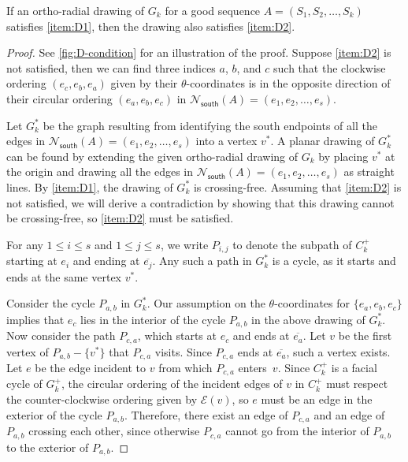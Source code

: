 \documentclass{article}\usepackage[a4paper,margin=20mm]{geometry}
\newcommand{\EE}{\mathcal{E}}
\newcommand{\Nsouth}{\mathcal{N}_\mathsf{south}}
\begin{document}
 \begin{lemma}\label{lem:good-drawing-condition}
If an ortho-radial drawing of $G_k$ for a good sequence $A=(S_1, S_2, \ldots, S_{k})$ satisfies \ref{item:D1}, then the drawing also satisfies \ref{item:D2}.
 \end{lemma}
 \begin{proof}
 See \cref{fig:D-condition} for an illustration of the proof.
 Suppose \ref{item:D2} is not satisfied, then we can find three indices $a$, $b$, and $c$ such that the clockwise ordering $(e_c, e_b, e_a)$  given  by their $\theta$-coordinates is in the opposite direction of their circular ordering $(e_a, e_b, e_c)$ in $\Nsouth(A) = (e_1, e_2, \ldots, e_s)$. 
 
 Let $G_k^\ast$ be the graph resulting from identifying the south endpoints of all the edges in $\Nsouth(A) = (e_1, e_2, \ldots, e_s)$ into a vertex $v^\ast$. 
 A planar drawing of $G_k^\ast$ can be found by extending the given ortho-radial drawing of $G_k$ by placing $v^\ast$ at the origin and drawing all the edges in $\Nsouth(A) = (e_1, e_2, \ldots, e_s)$ as straight lines. By \ref{item:D1}, the drawing of $G_k^\ast$ is crossing-free. Assuming that \ref{item:D2} is not satisfied, we will derive a contradiction by showing that this drawing cannot be crossing-free, so \ref{item:D2} must be satisfied.
 
For any $1 \leq i \leq s$ and $1 \leq j \leq s$, we write $P_{i,j}$ to denote the subpath of $C_k^+$ starting at $e_i$ and ending at $\overline{e_j}$. Any such a path in $G_k^\ast$ is a cycle, as it starts and ends at the same vertex $v^\ast$.

Consider the cycle $P_{a,b}$ in $G_k^\ast$. Our assumption on the $\theta$-coordinates for $\{e_a, e_b, e_c\}$ implies that $e_c$ lies in the interior of the cycle $P_{a,b}$ in the above drawing of $G_k^\ast$. Now consider the path $P_{c,a}$, which starts at $e_c$ and ends at $\overline{e_a}$. Let $v$ be the first vertex of $P_{a,b} - \{v^\ast\}$ that $P_{c,a}$ visits. Since  $P_{c,a}$ ends at $\overline{e_a}$, such a vertex exists. Let $e$ be the edge incident to $v$ from which $P_{c,a}$ enters~$v$. Since $C_k^+$ is a facial cycle of $G_k^+$, the circular ordering of the incident edges of $v$ in $C_k^+$  must respect the counter-clockwise ordering given by $\EE(v)$, so $e$ must be an edge in the exterior of the cycle $P_{a,b}$. Therefore, there exist an edge of $P_{c,a}$ and an edge of $P_{a,b}$ crossing each other, since otherwise $P_{c,a}$ cannot go from the interior of $P_{a,b}$ to the exterior of $P_{a,b}$. 
 \end{proof}
\end{document}

